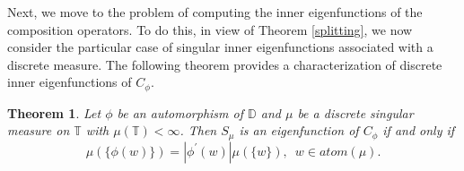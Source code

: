 \documentclass[12pt, reqno]{amsart}
\newtheorem{theorem}{Theorem}[section]
\theoremstyle{definition}
\numberwithin{equation}{section}
\begin{document}
Next, we move to the problem of computing the inner eigenfunctions of the composition operators. To do this, in view of Theorem \ref{splitting}, we now consider the particular case of singular inner eigenfunctions associated with a discrete  measure. The following theorem provides a characterization of discrete  inner eigenfunctions of $C_\phi$. 
\begin{theorem}\label{discrete}
	Let $\phi$ be an automorphism of $\mathbb{D}$ and $\mu$ be a discrete singular measure on $\mathbb{T}$ with $\mu({\mathbb{T}})<\infty$. Then
	$S_\mu$ is an eigenfunction of $C_\phi$ if and only if
	\begin{equation}\label{condition}
		\mu(\{\phi(w)\})=|\phi^{'} (w)|\mu(\{w\}), \,\, \, w \in atom(\mu).
	\end{equation} 
	
\end{theorem}
\end{document}
